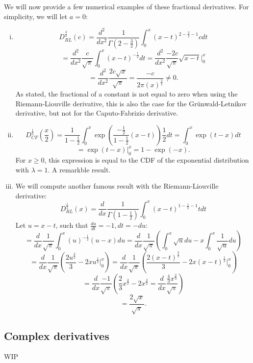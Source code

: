 We will now provide a few numerical examples of these fractional derivatives. For simplicity, we will let \(a = 0\):
\begin{example}
    \begin{enumerate}[(i)]
        \item 
    
    \[D^{\frac{3}{2}}_{RL}(c) = \frac{d^2}{dx^2} \frac{1}{\Gamma(2 - \frac{3}{2})}  \int_{0}^{x} (x-t)^{2 - \frac{3}{2}-1} c dt\]
    \[= \frac{d^2}{dx^2} \frac{c}{\sqrt{\pi}}  \int_{0}^{x} (x-t)^{- \frac{1}{2}} dt = \frac{d^2}{dx^2} \frac{-2c}{\sqrt{\pi}} \sqrt{x - t} \Big|_{0}^{x}\]
    \[= \frac{d^2}{dx^2} \frac{2c \sqrt{x}}{\sqrt{\pi}} = \frac{-c}{2\pi(x)^\frac{3}{2}} \neq 0.\] As stated, the fractional of a constant is not equal to zero when using the Riemann-Liouville derivative, this is also the case for the Grünwald-Letnikov derivative, but not for the Caputo-Fabrizio derivative.
    \item \[D^{\frac{1}{2}}_{CF}(\frac{x}{2}) = \frac{1}{1 - \frac{1}{2}}  \int_{0}^{x} \exp(\frac{-\frac{1}{2}}{1 - \frac{1}{2}}(x-t)) \frac{1}{2} dt = \int_{0}^{x} \exp(t - x) dt\]
    \[ =  \exp(t - x) \Big|_{0}^{x} = 1 - \exp(- x).\]
    For \(x \geq 0\), this expression is equal to the CDF of the exponential distribution with \(\lambda = 1\). A remarkble result.
    \item We will compute another famous result with the Riemann-Liouville derivative:
    \[D^{\frac{1}{2}}_{RL}(x) = \frac{d}{dx} \frac{1}{\Gamma(1 - \frac{1}{2})}  \int_{0}^{x} (x-t)^{1 - \frac{1}{2}-1} t dt\]
    Let \( u = x - t\), such that \(\frac{du}{dt} = -1, dt = -du\):
    \[=  \frac{d}{dx} \frac{1}{\sqrt{\pi}} \int_{0}^{x} (u)^{-\frac{1}{2}} (u - x) du =  \frac{d}{dx} \frac{1}{\sqrt{\pi}}(\int_{0}^{x} \sqrt{u} du - x\int_{0}^{x} \frac{1}{\sqrt{u}} du)\]
    \[ = \frac{d}{dx} \frac{1}{\sqrt{\pi}}(\frac{2u^\frac{3}{2}}{3} - 2 x u^\frac{1}{2} \Big|_{0}^{x}) = \frac{d}{dx} \frac{1}{\sqrt{\pi}}(\frac{2(x - t)^\frac{3}{2}}{3} - 2 x (x - t)^\frac{1}{2} \Big|_{0}^{x})\]
    \[=  \frac{d}{dx} \frac{-1}{\sqrt{\pi}}(\frac{2}{3}x^\frac{3}{2} - 2x^\frac{3}{2} = \frac{d}{dx} \frac{\frac{4}{3}x^\frac{2}{3}}{\sqrt{\pi}})\]
    \[ = \frac{2\sqrt{x}}{\sqrt{\pi}}.\]
    \end{enumerate}
\end{example}
\subsection{Complex derivatives}
WIP